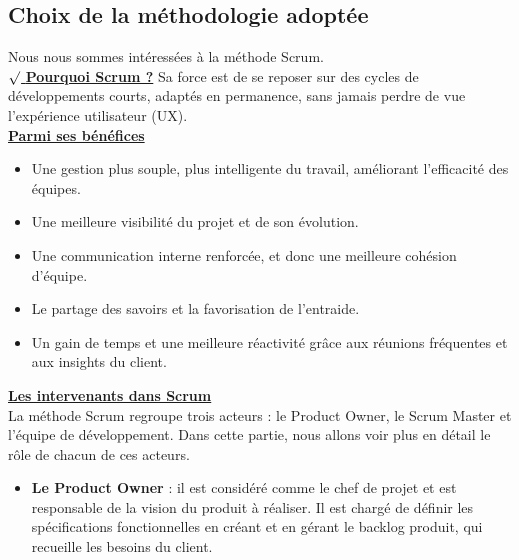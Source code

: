 \begin{sloppypar}
\subsection{Choix de la méthodologie adoptée }
\vspace{-4mm}
Nous nous sommes intéressées à la méthode Scrum. \\
\vspace{-1mm}
$\surd$\underline{ \textbf{  Pourquoi Scrum ?}}
       Sa force est de se reposer sur des cycles de développements courts, adaptés en permanence, sans jamais perdre de vue l’expérience utilisateur (UX). \\
\vspace{-1mm}
\underline{ \textbf{Parmi ses bénéfices }} 
\renewcommand{\labelitemi}{\tiny$\bullet$}
\begin{itemize}[leftmargin=1cm, topsep=0pt]
\vspace{-1mm}
 \item  Une gestion plus souple, plus intelligente du travail, améliorant l’efficacité des équipes. 
\vspace{-1mm}
 \item Une meilleure visibilité du projet et de son évolution.  
\vspace{-1mm}
 \item Une communication interne renforcée, et donc une meilleure cohésion d’équipe.   
\vspace{-1mm}
 \item Le partage des savoirs et la favorisation de l’entraide.  
\vspace{-1mm}
 \item Un gain de temps et une meilleure réactivité grâce aux réunions fréquentes et aux insights du client.
\end{itemize}
\vspace{-1mm}
\underline{ \textbf{Les intervenants dans Scrum }}\\
\vspace{-1mm}
        La méthode Scrum regroupe trois acteurs : le Product Owner, le Scrum Master et l’équipe de développement. Dans cette partie, nous allons voir plus en détail le rôle de chacun de ces acteurs. 
\renewcommand{\labelitemi}{\tiny$\bullet$}
\begin{itemize}[leftmargin=1cm, topsep=0pt]
\vspace{-2mm}
\item \textbf{Le Product Owner }: il est considéré comme le chef de projet et est responsable de la vision du produit à réaliser. Il est chargé de définir les spécifications fonctionnelles en créant et en gérant le backlog produit, qui recueille les besoins du client.

\end{itemize}
\end{sloppypar}
